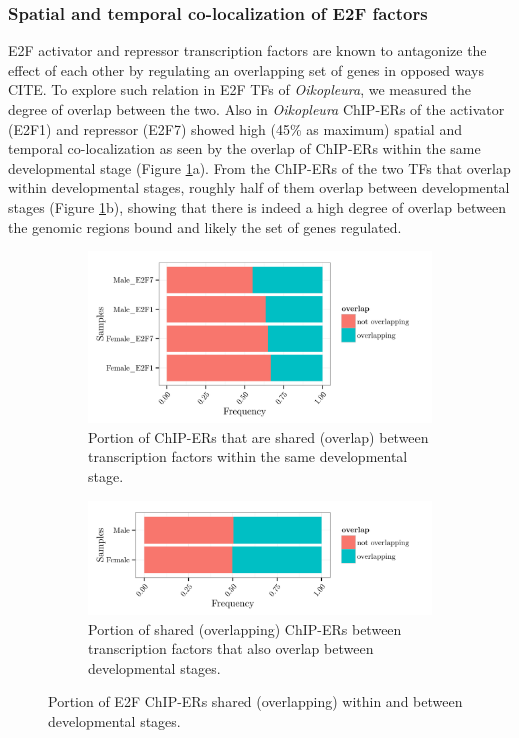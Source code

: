 \documentclass[11pt,twoside,a4paper]{report}
\begin{document}
		\subsubsection{Spatial and temporal co-localization of E2F factors}
		E2F activator and repressor transcription factors are known to antagonize the effect of each other by regulating an overlapping set of genes in opposed ways CITE. To explore such relation in E2F TFs of \textit{Oikopleura}, we measured the degree of overlap between the two. Also in \textit{Oikopleura} ChIP-ERs of the activator (E2F1) and repressor (E2F7) showed high (45\% as maximum) spatial and temporal co-localization as seen by the overlap of ChIP-ERs within the same developmental stage (Figure \ref{fig:E2F_colocalization}a). From the ChIP-ERs of the two TFs that overlap within developmental stages, roughly half of them overlap between developmental stages (Figure \ref{fig:E2F_colocalization}b), showing that there is indeed a high degree of overlap between the genomic regions bound and likely the set of genes regulated.
    	
		\begin{figure}[here]
			\setlength{\belowcaptionskip}{5pt}
			\centering
			\begin{subfigure}[b]{1\textwidth}
				\centering
				\includegraphics[width=0.75\linewidth]{pngs/E2F_overlap.png}
				\caption{Portion of ChIP-ERs that are shared (overlap) between transcription factors within the same developmental stage.}
			\end{subfigure}
			\begin{subfigure}[b]{1\textwidth}
				\centering
				\includegraphics[width=0.75\linewidth]{pngs/E2F_overlap_overlaps.png}
				\caption{Portion of shared (overlapping) ChIP-ERs between transcription factors that also overlap between developmental stages.}
			\end{subfigure}
			\caption{Portion of E2F ChIP-ERs shared (overlapping) within and between developmental stages.}
			\label{fig:E2F_colocalization}
		\end{figure}
		
\end{document}
